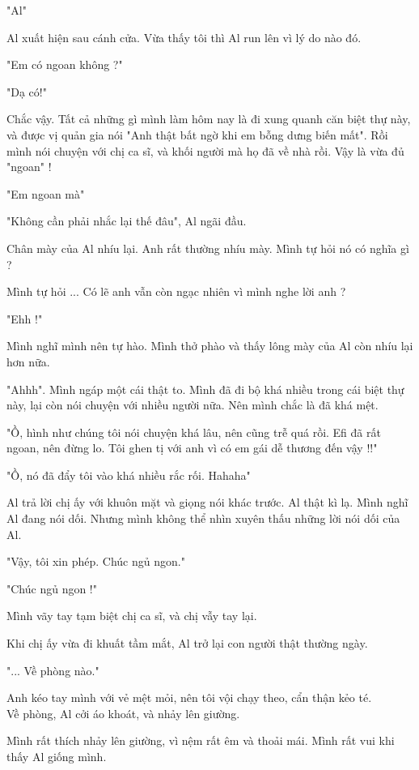 "Al"

Al xuất hiện sau cánh cửa. Vừa thấy tôi thì Al run lên vì lý do nào đó.

"Em có ngoan không ?"

"Dạ có!"

Chắc vậy. Tất cả những gì mình làm hôm nay là đi xung quanh căn biệt thự này, và được vị quản gia nói "Anh thật bất ngờ khi em bỗng dưng biến mất". Rồi mình nói chuyện với chị ca sĩ, và khối người mà họ đã về nhà rồi. Vậy là vừa đủ "ngoan" !

"Em ngoan mà"

"Không cần phải nhắc lại thế đâu", Al ngãi đầu.

Chân mày của Al nhíu lại. Anh rất thường nhíu mày. Mình tự hỏi nó có nghĩa gì ?

Mình tự hỏi ... Có lẽ anh vẫn còn ngạc nhiên vì mình nghe lời anh ?

"Ehh !"

Mình nghĩ mình nên tự hào. Mình thở phào và thấy lông mày của Al còn nhíu lại hơn nữa.

"Ahhh". Mình ngáp một cái thật to. Mình đã đi bộ khá nhiều trong cái biệt thự này, lại còn nói chuyện với nhiều người nữa. Nên mình chắc là đã khá mệt.

"Ồ, hình như chúng tôi nói chuyện khá lâu, nên cũng trễ quá rồi. Efi đã rất ngoan, nên đừng lo. Tôi ghen tị với anh vì có em gái dễ thương đến vậy !!"

"Ồ, nó đã đẩy tôi vào khá nhiều rắc rối. Hahaha"

Al trả lời chị ấy với khuôn mặt và giọng nói khác trước. Al thật kì lạ. Mình nghĩ Al đang nói dối. Nhưng mình không thể nhìn xuyên thấu những lời nói dối của Al.

"Vậy, tôi xin phép. Chúc ngủ ngon."

"Chúc ngủ ngon !"

Mình vãy tay tạm biệt chị ca sĩ, và chị vẫy tay lại.

Khi chị ấy vừa đi khuất tầm mắt, Al trở lại con người thật thường ngày.

"... Về phòng nào."

Anh kéo tay mình với vẻ mệt mỏi, nên tôi vội chạy theo, cẩn thận kẻo té.\\


Về phòng, Al cởi áo khoát, và nhảy lên giường.

Mình rất thích nhảy lên giường, vì nệm rất êm và thoải mái. Mình rất vui khi thấy Al giống mình.

